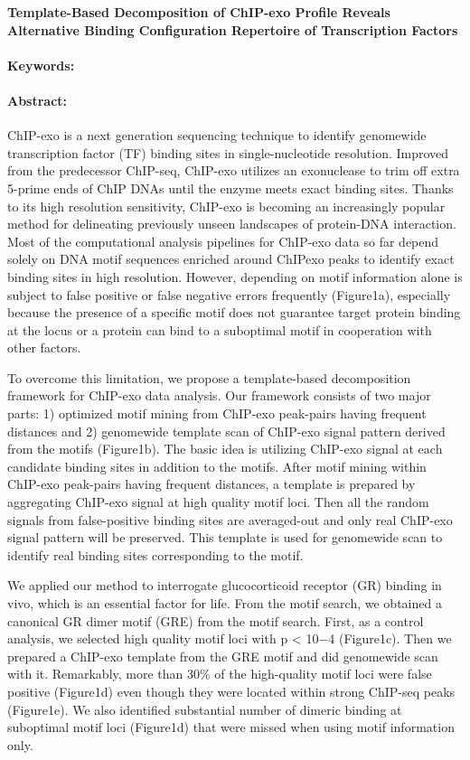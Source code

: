 \noindent
\large {\bf Template-Based Decomposition of ChIP-exo Profile Reveals Alternative Binding Configuration Repertoire of Transcription Factors} 


\normalsize 


\noindent \paragraph{Keywords:} 

\noindent \paragraph{Abstract:} 

ChIP-exo is a next generation sequencing technique to
identify genomewide transcription factor (TF) binding
sites in single-nucleotide resolution. Improved from the
predecessor ChIP-seq, ChIP-exo utilizes an exonuclease
to trim off extra 5-prime ends of ChIP DNAs until the
enzyme meets exact binding sites. Thanks to its high resolution sensitivity, ChIP-exo is becoming an increasingly
popular method for delineating previously unseen landscapes of protein-DNA interaction. Most of the computational analysis pipelines for ChIP-exo data so far depend
solely on DNA motif sequences enriched around ChIPexo peaks to identify exact binding sites in high resolution. However, depending on motif information alone is
subject to false positive or false negative errors frequently
(Figure1a), especially because the presence of a specific
motif does not guarantee target protein binding at the locus or a protein can bind to a suboptimal motif in cooperation with other factors.


To overcome this limitation, we propose a template-based
decomposition framework for ChIP-exo data analysis. Our
framework consists of two major parts: 1) optimized motif
mining from ChIP-exo peak-pairs having frequent distances and 2) genomewide template scan of ChIP-exo
signal pattern derived from the motifs (Figure1b). The
basic idea is utilizing ChIP-exo signal at each candidate
binding sites in addition to the motifs. After motif mining
within ChIP-exo peak-pairs having frequent distances, a
template is prepared by aggregating ChIP-exo signal at
high quality motif loci. Then all the random signals from
false-positive binding sites are averaged-out and only real
ChIP-exo signal pattern will be preserved. This template
is used for genomewide scan to identify real binding sites
corresponding to the motif.

We applied our method to interrogate glucocorticoid receptor (GR) binding in vivo, which is an essential factor
for life. From the motif search, we obtained a canonical
GR dimer motif (GRE) from the motif search. First, as a
control analysis, we selected high quality motif loci with p
< 10−4 (Figure1c). Then we prepared a ChIP-exo template
from the GRE motif and did genomewide scan with it.
Remarkably, more than 30\% of the high-quality motif loci
were false positive (Figure1d) even though they were
located within strong ChIP-seq peaks (Figure1e). We also
identified substantial number of dimeric binding at suboptimal motif loci (Figure1d) that were missed when using
motif information only.

